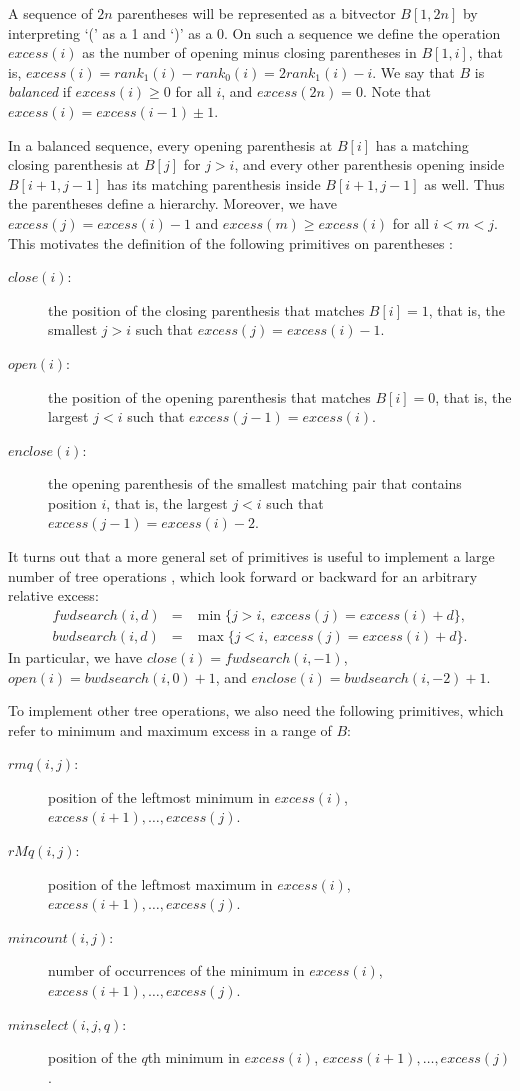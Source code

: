 \documentclass[11pt]{article}
\newcommand{\0}{\mathit{0}}
\newcommand{\1}{\mathit{1}}
\newcommand{\rank}{\mathit{rank}}
\newcommand{\excess}{\mathit{excess}}
\newcommand{\fwdsearch}{\mathit{fwdsearch}}
\newcommand{\bwdsearch}{\mathit{bwdsearch}}
\newcommand{\close}{\mathit{close}}
\newcommand{\open}{\mathit{open}}
\newcommand{\enclose}{\mathit{enclose}}
\newcommand{\rmq}{\mathit{rmq}}
\newcommand{\rMq}{\mathit{rMq}}
\newcommand{\mincount}{\mathit{mincount}}
\newcommand{\minselect}{\mathit{minselect}}
\begin{document}
A sequence of $2n$ parentheses will be represented as a bitvector $B[1,2n]$
by interpreting `(' as a 1 and `)' as a 0. On such a sequence we define the
operation $\excess(i)$ as the number of opening minus closing parentheses in
$B[1,i]$, that is, $\excess(i) = \rank_1(i)-\rank_0(i) = 2\rank_1(i)-i$.
We say that $B$ is {\em balanced} if $\excess(i) \ge 0$ for all $i$, and 
$\excess(2n)=0$. Note that $\excess(i)=\excess(i-1)\pm 1$.

In a balanced sequence, every opening parenthesis at $B[i]$ has a matching 
closing parenthesis at $B[j]$ for $j>i$, and every other parenthesis opening
inside $B[i+1,j-1]$ has its matching parenthesis inside $B[i+1,j-1]$ as well.
Thus the parentheses define a hierarchy. Moreover, we have 
$\excess(j)=\excess(i)-1$ and $\excess(m) \ge \excess(i)$ for all $i < m < j$. 
This motivates the definition of the following primitives on parentheses
\cite{MR01}:
\begin{description}
        \item[$\close(i)$:] the position of the closing parenthesis that matches
		$B[i]=1$, that is, the smallest $j>i$ such that
                $\excess(j)=\excess(i)-1$.
        \item[$\open(i)$:] the position of the opening parenthesis that matches
		$B[i]=0$, that is, the largest $j<i$ such that
                $\excess(j-1)=\excess(i)$.
        \item[$\enclose(i)$:] the opening parenthesis of the smallest matching 
		pair that contains position $i$, that is, the largest $j<i$
		such that $\excess(j-1)=excess(i)-2$.
\end{description}

It turns out that a more general set of primitives is useful to implement a
large number of tree operations \cite{NS14}, which look forward or backward
for an arbitrary relative excess:
\begin{eqnarray*}
\fwdsearch(i,d)
	&\!=\!& \min \{ j>i,~\excess(j)=excess(i)+d \}, \\
\bwdsearch(i,d)
	&\!=\!& \max \{ j<i,~\excess(j)=excess(i)+d \}.
\end{eqnarray*}
In particular, we have $\close(i)=\fwdsearch(i,-1)$, 
$\open(i)=\bwdsearch(i,0)+1$, and $\enclose(i)=\bwdsearch(i,-2)+1$.

To implement other tree operations, we also need the following primitives,
which refer to minimum and maximum excess in a range of $B$:
\begin{description}
\item[$\rmq(i,j)$:] position of the leftmost minimum in $\excess(i)$,
$\excess(i+1),\ldots,\excess(j)$.
\item[$\rMq(i,j)$:] position of the leftmost maximum in $\excess(i)$,
$\excess(i+1),\ldots,\excess(j)$.
\item[$\mincount(i,j)$:] number of occurrences of the minimum in $\excess(i)$,
$\excess(i+1),\ldots,\excess(j)$.
\item[$\minselect(i,j,q)$:] position of the $q$th minimum in $\excess(i)$,
$\excess(i+1),\ldots,\excess(j)$.
\end{description}
\end{document}
